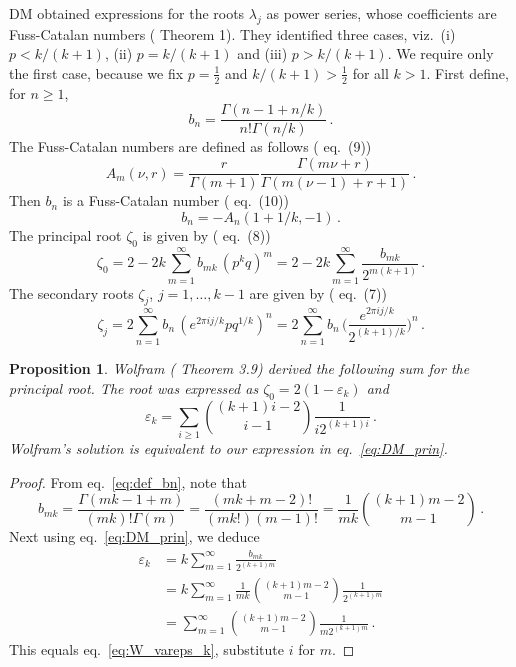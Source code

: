 \documentclass[review]{elsarticle}
\theoremstyle{plain}
\newtheorem{proposition}[theorem]{Proposition}
\begin{document}
DM obtained expressions for the roots $\lambda_j$ as power series,
whose coefficients are Fuss-Catalan numbers (\cite{DM3} Theorem 1).
They identified three cases, viz.~(i) $p<k/(k+1)$, (ii) $p=k/(k+1)$ and (iii) $p>k/(k+1)$.
We require only the first case, because we fix $p=\frac12$ and $k/(k+1)>\frac12$ for all $k>1$.
First define, for $n\ge1$,
\begin{equation}
\label{eq:def_bn}
b_n = \frac{\Gamma(n-1+n/k)}{n!\Gamma(n/k)} \,.
\end{equation}
The Fuss-Catalan numbers are defined as follows (\cite{DM3} eq.~(9))
\begin{equation}
\label{eq:FussCat_def}
A_m(\nu,r) = \frac{r}{\Gamma(m+1)}\frac{\Gamma(m\nu+r)}{\Gamma(m(\nu-1)+r+1)}\,.
\end{equation}
Then $b_n$ is a Fuss-Catalan number (\cite{DM3} eq.~(10))
\begin{equation}
b_n = -A_n(1+1/k, -1)\,.
\end{equation}
The principal root $\zeta_0$ is given by (\cite{DM3} eq.~(8))
\begin{equation}
\label{eq:DM_prin}
  \zeta_0 = 2 - 2k\sum_{m=1}^\infty b_{mk} \, (p^kq)^m
  = 2 - 2k\sum_{m=1}^\infty \frac{b_{mk}}{2^{m(k+1)}} \,.
\end{equation}
The secondary roots $\zeta_j$, $j=1,\dots,k-1$ are given by (\cite{DM3} eq.~(7))
\begin{equation}
\label{eq:secroots}
\zeta_j = 2\sum_{n=1}^\infty b_n \, (e^{2\pi ij/k}pq^{1/k})^n 
= 2\sum_{n=1}^\infty b_n \, \biggl(\frac{e^{2\pi ij/k}}{2^{(k+1)/k}}\biggr)^n \,. 
\end{equation}
\begin{proposition}  
Wolfram (\cite{Wolfram} Theorem 3.9) derived the following sum for the principal root.
The root was expressed as $\zeta_0 = 2(1-\varepsilon_k)$ and
\begin{equation}
\label{eq:W_vareps_k}
\varepsilon_k = \sum_{i\ge1} \binom{(k+1)i-2}{i-1}\frac{1}{i2^{(k+1)i}} \,.
\end{equation}
Wolfram's solution is equivalent to our expression in eq.~\eqref{eq:DM_prin}.
\end{proposition}
\begin{proof}
From eq.~\eqref{eq:def_bn}, note that
\begin{equation}
b_{mk} = \frac{\Gamma(mk-1+m)}{(mk)!\Gamma(m)} = \frac{(mk+m-2)!}{(mk!)(m-1)!} = \frac{1}{mk}\binom{(k+1)m-2}{m-1} \,.
\end{equation}
Next using eq.~\eqref{eq:DM_prin}, we deduce
\begin{equation}
\begin{split}
\varepsilon_k &= k\sum_{m=1}^\infty \frac{b_{mk}}{2^{(k+1)m}} 
\\
&= k\sum_{m=1}^\infty \frac{1}{mk}\binom{(k+1)m-2}{m-1}\frac{1}{2^{(k+1)m}} 
\\
&= \sum_{m=1}^\infty \binom{(k+1)m-2}{m-1}\frac{1}{m2^{(k+1)m}} \,.
\end{split}
\end{equation}
This equals eq.~\eqref{eq:W_vareps_k}, substitute $i$ for $m$.
\end{proof}
\end{document}
